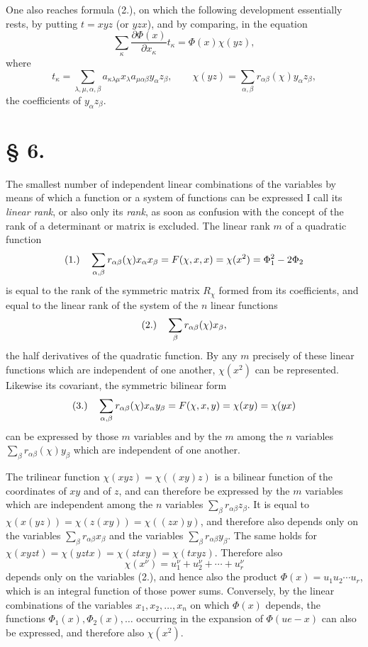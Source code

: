 \documentclass[11pt]{article}
\newcommand{\fnum}[1]{\textup{(\ensuremath{#1}.)}\quad}
\begin{document}
One also reaches formula (2.), on which the following development essentially rests, by putting $t=xyz$ (or $yzx$), and by comparing, in the equation
\[
 \sum_\kappa\frac{\partial\Phi(x)}{\partial x_\kappa}t_\kappa=\Phi(x)\chi(yz),
\]
where
\[
 t_\kappa=\sum_{\lambda,\mu,\alpha,\beta}a_{\kappa\lambda\mu}x_\lambda a_{\mu\alpha\beta}y_\alpha z_\beta,\qquad
 \chi(yz)=\sum_{\alpha,\beta}r_{\alpha\beta}(\chi)y_\alpha z_\beta,
\]
the coefficients of $y_\alpha z_\beta$.

\section*{§ 6.}

The smallest number of independent linear combinations of the variables by means of which a function or a system of functions can be expressed I call its \emph{linear rank}, or also only its \emph{rank}, as soon as confusion with the concept of the rank of a determinant or matrix is excluded. The linear rank $m$ of a quadratic function
\[
\fnum{1} \sum_{\alpha,\beta}r_{\alpha\beta}(\chi)x_\alpha x_\beta
=F(\chi,x,x)=\chi(x^2)=\Phi_1^2-2\Phi_2
\]
is equal to the rank of the symmetric matrix $R_\chi$ formed from its coefficients, and equal to the linear rank of the system of the $n$ linear functions
\[
\fnum{2} \sum_\beta r_{\alpha\beta}(\chi)x_\beta,
\]
the half derivatives of the quadratic function. By any $m$ precisely of these linear functions which are independent of one another, $\chi(x^2)$ can be represented. Likewise its covariant, the symmetric bilinear form
\[
\fnum{3} \sum_{\alpha,\beta}r_{\alpha\beta}(\chi)x_\alpha y_\beta
=F(\chi,x,y)=\chi(xy)=\chi(yx)
\]
can be expressed by those $m$ variables and by the $m$ among the $n$ variables $\sum_\beta r_{\alpha\beta}(\chi)y_\beta$ which are independent of one another.

The trilinear function $\chi(xyz)=\chi((xy)z)$ is a bilinear function of the coordinates of $xy$ and of $z$, and can therefore be expressed by the $m$ variables which are independent among the $n$ variables $\sum_\beta r_{\alpha\beta}z_\beta$. It is equal to $\chi(x(yz))=\chi(z(xy))=\chi((zx)y)$, and therefore also depends only on the variables $\sum_\beta r_{\alpha\beta}x_\beta$ and the variables $\sum_\beta r_{\alpha\beta}y_\beta$. The same holds for $\chi(xyzt)=\chi(yztx)=\chi(ztxy)=\chi(txyz)$. Therefore also
\[
 \chi(x^\nu)=u_1^\nu+u_2^\nu+\cdots+u_r^\nu
\]
depends only on the variables (2.), and hence also the product $\Phi(x)=u_1u_2\cdots u_r$, which is an integral function of those power sums. Conversely, by the linear combinations of the variables $x_1,x_2,\ldots,x_n$ on which $\Phi(x)$ depends, the functions $\Phi_1(x),\Phi_2(x),\ldots$ occurring in the expansion of $\Phi(ue-x)$ can also be expressed, and therefore also $\chi(x^2)$.
\end{document}
